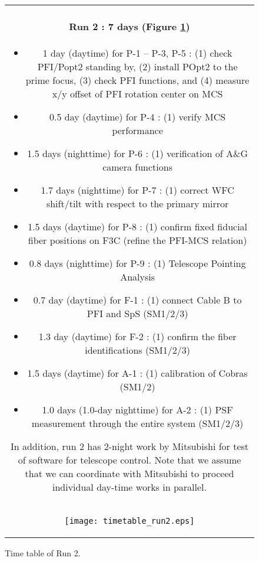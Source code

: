 \begin{figure}[!ht]
\begin{center}
\begin{tabular}{c}
\begin{minipage}{0.95\hsize}
\paragraph{Run 2 : 7 days  (Figure \ref{fig:run2})}
	\begin{itemize}
	\item 1 day (daytime) for P-1 -- P-3, P-5 :
	(1) check PFI/Popt2 standing by,
	(2) install POpt2 to the prime focus,
	(3) check PFI functions, and
	(4) measure x/y offset of PFI rotation center on MCS
	\item 0.5 day (daytime) for P-4 :
	(1) verify  MCS performance
	\item 1.5 days (nighttime) for P-6 :
	(1) verification of A\&G camera functions 
	\item 1.7 days (nighttime) for P-7 :
	(1) correct WFC shift/tilt with respect to the primary mirror
	\item 1.5 days (daytime) for P-8 :  
	(1) confirm fixed fiducial fiber positions on F3C (refine the PFI-MCS relation)
	\item 0.8 days (nighttime) for P-9 :
	(1) Telescope Pointing Analysis
	\item 0.7 day (daytime) for F-1 : 
	(1) connect Cable B to PFI and SpS (SM1/2/3)
	\item 1.3 day (daytime) for F-2 :  
	(1) confirm  the fiber identifications (SM1/2/3)
	\item 1.5 days (daytime) for A-1 : 
	(1) calibration of Cobras (SM1/2)
	\item 1.0 days (1.0-day nighttime) for A-2 : 
	(1) PSF measurement through the entire system (SM1/2/3)	
\end{itemize}
In addition, run 2 has 2-night work by Mitsubishi for test of software for telescope control.
Note that we assume that we can coordinate with Mitsubishi to proceed individual day-time works in parallel.
\end{minipage} \\
\begin{minipage}{0.8\hsize}
	\begin{center}
	\vspace*{5mm}
	\texttt{[image: timetable\_run2.eps]}
	\end{center}
	\vspace*{-5mm}
	\caption{Time table of Run 2.}
	\label{fig:run2}
\end{minipage}
\end{tabular}
\end{center}
\end{figure}

